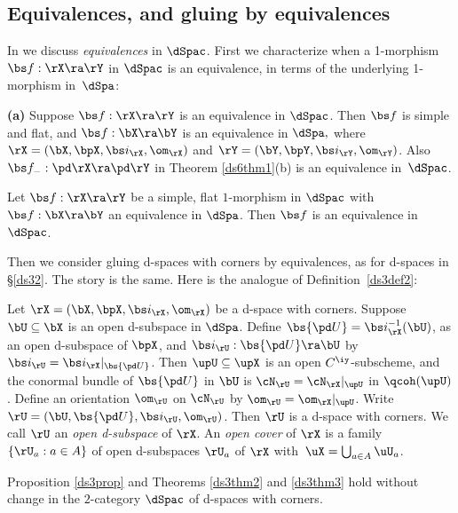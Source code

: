 \documentclass{article}
\begin{document}
\subsection{Equivalences, and gluing by equivalences}
\label{ds64}

In \cite[\S 6.5 \& \S 6.6]{Joyc6} we discuss {\it equivalences\/} in
$\dSpac$. First we characterize when a 1-morphism $\bs f:\rX\ra\rY$
in $\dSpac$ is an equivalence, in terms of the underlying 1-morphism
in~$\dSpa$:

\begin{prop}{\bf(a)} Suppose\/ $\bs f:\rX\ra\rY$ is an equivalence
in $\dSpac$. Then $\bs f$ is simple and flat, and\/ $\bs
f:\bX\ra\bY$ is an equivalence in\/ $\dSpa,$ where
$\rX=(\bX,\bpX,\bs i_\rX,\om_\rX)$ and\/ $\rY=(\bY,\bpY,\bs
i_\rY,\om_\rY)$. Also\/ $\bs f_-:\pd\rX\ra\pd\rY$ in Theorem\/
{\rm\ref{ds6thm1}(b)} is an equivalence in\/~$\dSpac$.
\smallskip

 Let\/ $\bs f:\rX\ra\rY$ be a simple, flat\/
$1$-morphism in $\dSpac$ with\/ $\bs f:\bX\ra\bY$ an equivalence
in\/ $\dSpa$. Then $\bs f$ is an equivalence in\/~$\dSpac$.
\label{ds6prop1}
\end{prop}

Then we consider gluing d-spaces with corners by equivalences, as
for d-spaces in \S\ref{ds32}. The story is the same. Here is the
analogue of Definition~\ref{ds3def2}:

\begin{dfn} Let $\rX=(\bX,\bpX,\bs i_\rX,\om_\rX)$ be a d-space
with corners. Suppose $\bU\subseteq\bX$ is an open d-subspace in
$\dSpa$. Define $\bs{\pd U}=\bs i_\rX^{-1}(\bU)$, as an open
d-subspace of $\bpX$, and $\bs i_\rU:\bs{\pd U}\ra\bU$ by $\bs
i_\rU=\bs i_\rX\vert_{\bs{\pd U}}$. Then $\upU\subseteq\upX$ is an
open $C^\iy$-subscheme, and the conormal bundle of $\bs{\pd U}$ in
$\bU$ is $\cN_\rU=\cN_\rX\vert_\upU$ in $\qcoh(\upU)$. Define an
orientation $\om_\rU$ on $\cN_\rU$ by $\om_\rU=\om_\rX\vert_\upU$.
Write $\rU=(\bU,\bs{\pd U},\bs i_\rU,\om_\rU)$. Then $\rU$ is a
d-space with corners. We call $\rU$ an {\it open d-subspace\/} of
$\rX$. An {\it open cover\/} of $\rX$ is a family $\{\rU_a:a\in A\}$
of open d-subspaces $\rU_a$ of $\rX$ with~$\uX=\bigcup_{a\in
A}\uU_a$.
\label{ds6def3}
\end{dfn}

\begin{thm} Proposition\/ {\rm\ref{ds3prop}} and Theorems\/
{\rm\ref{ds3thm2}} and\/ {\rm\ref{ds3thm3}} hold without change in
the $2$-category\/ $\dSpac$ of d-spaces with corners.
\label{ds6thm2}
\end{thm}
\end{document}
